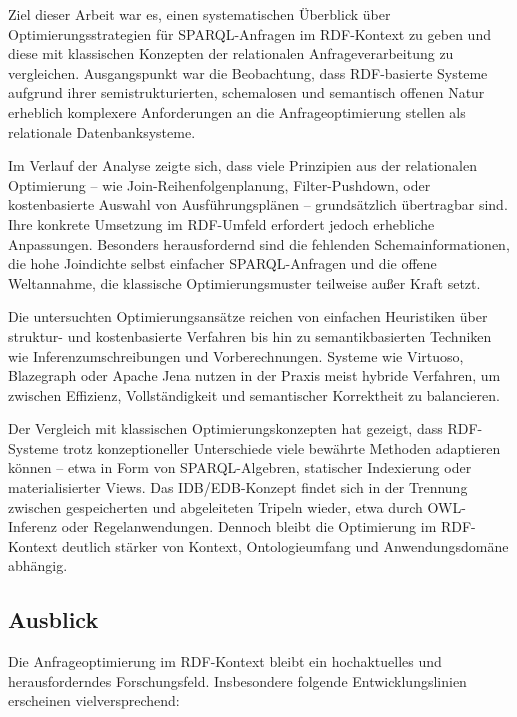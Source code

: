 \documentclass[12pt]{article}
\begin{document}
Ziel dieser Arbeit war es, einen systematischen Überblick über Optimierungsstrategien für SPARQL-Anfragen im RDF-Kontext zu geben und diese mit klassischen Konzepten der relationalen Anfrageverarbeitung zu vergleichen. Ausgangspunkt war die Beobachtung, dass RDF-basierte Systeme aufgrund ihrer semistrukturierten, schemalosen und semantisch offenen Natur erheblich komplexere Anforderungen an die Anfrageoptimierung stellen als relationale Datenbanksysteme.

Im Verlauf der Analyse zeigte sich, dass viele Prinzipien aus der relationalen Optimierung – wie Join-Reihenfolgenplanung, Filter-Pushdown, oder kostenbasierte Auswahl von Ausführungsplänen – grundsätzlich übertragbar sind. Ihre konkrete Umsetzung im RDF-Umfeld erfordert jedoch erhebliche Anpassungen. Besonders herausfordernd sind die fehlenden Schemainformationen, die hohe Joindichte selbst einfacher SPARQL-Anfragen und die offene Weltannahme, die klassische Optimierungsmuster teilweise außer Kraft setzt.

Die untersuchten Optimierungsansätze reichen von einfachen Heuristiken über struktur- und kostenbasierte Verfahren bis hin zu semantikbasierten Techniken wie Inferenzumschreibungen und Vorberechnungen. Systeme wie Virtuoso, Blazegraph oder Apache Jena nutzen in der Praxis meist hybride Verfahren, um zwischen Effizienz, Vollständigkeit und semantischer Korrektheit zu balancieren.

Der Vergleich mit klassischen Optimierungskonzepten hat gezeigt, dass RDF-Systeme trotz konzeptioneller Unterschiede viele bewährte Methoden adaptieren können – etwa in Form von SPARQL-Algebren, statischer Indexierung oder materialisierter Views. Das IDB/EDB-Konzept findet sich in der Trennung zwischen gespeicherten und abgeleiteten Tripeln wieder, etwa durch OWL-Inferenz oder Regelanwendungen. Dennoch bleibt die Optimierung im RDF-Kontext deutlich stärker von Kontext, Ontologieumfang und Anwendungsdomäne abhängig.

\subsection*{Ausblick}

Die Anfrageoptimierung im RDF-Kontext bleibt ein hochaktuelles und herausforderndes Forschungsfeld. Insbesondere folgende Entwicklungslinien erscheinen vielversprechend:
\end{document}
